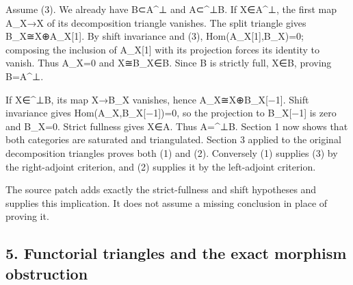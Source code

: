Assume (3)\allowbreak{}. We already have B⊂A\^{}⊥ and A⊂\^{}⊥B. If X\allowbreak{}∈A\textasciicircum{}⊥,\allowbreak{} the first map A\_\allowbreak{}X\allowbreak{}→X of its decomposition triangle vanishes. The split triangle gives B\_\allowbreak{}X≅X\allowbreak{}⊕A\_\allowbreak{}X[1]\allowbreak{}. By shift invariance and (3)\allowbreak{},\allowbreak{} Hom(A\_\allowbreak{}X[1]\allowbreak{},\allowbreak{}B\_\allowbreak{}X)\allowbreak{}\allowbreak{}=0; composing the inclusion of A\_\allowbreak{}X[1]\allowbreak{} with its projection forces its identity to vanish. Thus A\_\allowbreak{}X\allowbreak{}=0 and X≅B\_\allowbreak{}X\allowbreak{}∈B. Since B is strictly full,\allowbreak{} X\allowbreak{}∈B,\allowbreak{} proving B\allowbreak{}=A\textasciicircum{}⊥.

If X\allowbreak{}∈\textasciicircum{}⊥B,\allowbreak{} its map X\allowbreak{}→B\_\allowbreak{}X vanishes,\allowbreak{} hence A\_\allowbreak{}X≅X\allowbreak{}⊕B\_\allowbreak{}X[−1]\allowbreak{}. Shift invariance gives Hom(A\_\allowbreak{}X,\allowbreak{}B\_\allowbreak{}X[−1]\allowbreak{})\allowbreak{}\allowbreak{}=0,\allowbreak{} so the projection to B\_\allowbreak{}X[−1]\allowbreak{} is zero and B\_\allowbreak{}X\allowbreak{}=0. Strict fullness gives X\allowbreak{}∈A. Thus A\allowbreak{}=\textasciicircum{}⊥B. Section 1 now shows that both categories are saturated and triangulated. Section 3 applied to the original decomposition triangles proves both (1)\allowbreak{} and (2)\allowbreak{}. Conversely (1)\allowbreak{} supplies (3)\allowbreak{} by the right-adjoint criterion,\allowbreak{} and (2)\allowbreak{} supplies it by the left-adjoint criterion.

The source patch adds exactly the strict-fullness and shift hypotheses and supplies this implication. It does not assume a missing conclusion in place of proving it.

\subsection{5. Functorial triangles and the exact morphism obstruction}\label{proofs-11665-12003-functorial-triangles-and-the-exact-morphism-obstruction}

